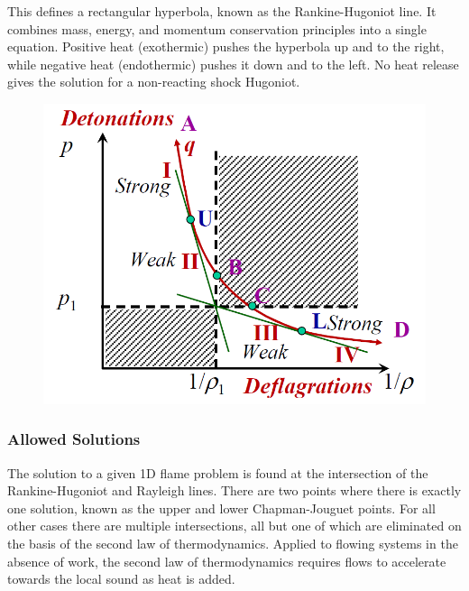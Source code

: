 \documentclass[11pt]{article}
\begin{document}
This defines a rectangular hyperbola, known as the Rankine-Hugoniot line. It combines mass, energy, and momentum conservation principles into a single equation. Positive heat (exothermic) pushes the hyperbola up and to the right, while negative heat (endothermic) pushes it down and to the left. No heat release gives the solution for a non-reacting shock Hugoniot.
\begin{figure}[h]
\centering
\includegraphics[scale=0.5]{Graphics/detonations_deflagrations.PNG}
\end{figure}

\subsubsection{Allowed Solutions}
The solution to a given 1D flame problem is found at the intersection of the Rankine-Hugoniot and Rayleigh lines. There are two points where there is exactly one solution, known as the upper and lower Chapman-Jouguet points. For all other cases there are multiple intersections, all but one of which are eliminated on the basis of the second law of thermodynamics. Applied to flowing systems in the absence of work, the second law of thermodynamics requires flows to accelerate towards the local sound as heat is added.
\end{document}
